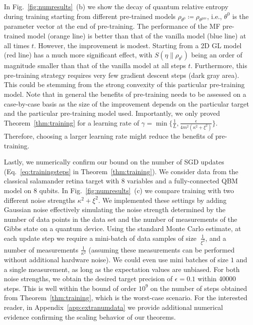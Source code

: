 \documentclass[
    aps,
    prx,
    onecolumn
]{revtex4-2}
\begin{document}
In Fig.~\ref{fig:numresults}~(b) we show the decay of quantum relative entropy during training starting from different pre-trained models $\rho_{\theta^0} \coloneqq \rho_{\theta^\mathrm{pre}}$, i.e., $\theta^0$ is the parameter vector at the end of pre-training. The performance of the MF pre-trained model (orange line) is better than that of the vanilla model (blue line) at all times $t$. However, the improvement is modest. Starting from a 2D GL model (red line) has a much more significant effect, with $S(\eta \|\rho_{\theta^t})$ being an order of magnitude smaller than that of the vanilla model at all steps $t$. Furthermore, this pre-training strategy requires very few gradient descent steps (dark gray area). This could be stemming from the strong convexity of this particular pre-training model. Note that in general the benefits of pre-training needs to be assessed on a case-by-case basis as the size of the improvement depends on the particular target and the particular pre-training model used. Importantly, we only proved Theorem~\ref{thm:training} for a learning rate of $\gamma = \min \{ \frac{1}{L}, \frac{\epsilon}{4m^2(\kappa^2 +\xi^2)}\}$. Therefore, choosing a larger learning rate might reduce the benefits of pre-training. 

Lastly, we numerically confirm our bound on the number of SGD updates (Eq.~\eqref{eq:trainingsteps} in Theorem~\ref{thm:training}). We consider data from the classical salamander retina target with $8$ variables and a fully-connected QBM model on $8$ qubits. 
In Fig.~\ref{fig:numresults}~(c) we compare training with two different noise strengths $\kappa^2+\xi^2$. We implemented these settings by adding Gaussian noise effectively simulating the noise strength determined by the number of data points in the data set and the number of measurements of the Gibbs state on a quantum device. Using the standard Monte Carlo estimate, at each update step we require a mini-batch of data samples of size $~\frac{1}{\xi^2}$, and a number of measurements $\frac{1}{\kappa^2}$ (assuming these measurements can be performed without additional hardware noise). We could even use mini batches of size $1$ and a single measurement, as long as the expectation values are unbiased. For both noise strengths, we obtain the desired target precision of $\epsilon=0.1$ within 40000 steps. This is well within the bound of order $10^9$ on the number of steps obtained from Theorem~\ref{thm:training}, which is the worst-case scenario. For the interested reader, in Appendix~\ref{app:extranumdata} we provide additional numerical evidence confirming the scaling behavior of our theorems.
\end{document}
